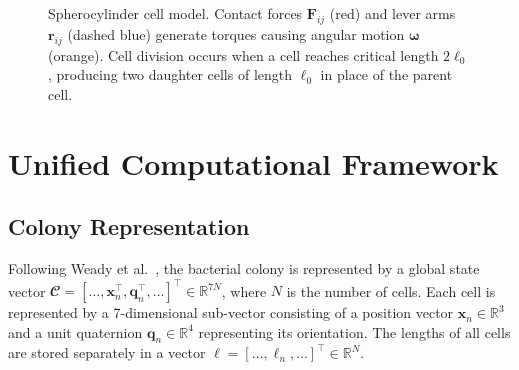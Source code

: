 \documentclass[conference]{IEEEtran}
\begin{document}
\begin{figure}[H]
    \caption{Spherocylinder cell model. Contact forces $\mathbf{F}_{ij}$ (red) and lever arms $\mathbf{r}_{ij}$ (dashed blue) generate torques causing angular motion $\boldsymbol{\omega}$ (orange). Cell division occurs when a cell reaches critical length $2\ell_0$, producing two daughter cells of length $\ell_0$ in place of the parent cell.}
    \label{fig:spherocylinder_model}

\end{figure}

\section{Unified Computational Framework}

\subsection{Colony Representation}

Following Weady et al.~\cite{Weady2024SM}, the bacterial colony is represented by a global state vector $\mathbfcal{C} = [\dots, \mathbf{x}_n^\top, \mathbf{q}_n^\top, \dots]^\top \in \mathbb{R}^{7N}$, where $N$ is the number of cells. Each cell is represented by a 7-dimensional sub-vector consisting of a position vector $\mathbf{x}_n \in \mathbb{R}^3$ and a unit quaternion $\mathbf{q}_n \in \mathbb{R}^4$ representing its orientation. The lengths of all cells are stored separately in a vector $\boldsymbol{\ell} = [\dots, \ell_n, \dots]^\top \in \mathbb{R}^{N}$.
\end{document}
